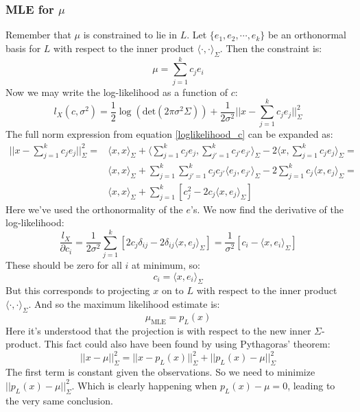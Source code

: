 \documentclass[12pt, a4paper]{article}
\numberwithin{equation}{section}
\begin{document}
\subsubsection{MLE for $\mu$}
Remember that $\mu$ is constrained to lie in $L$. Let $\{e_1,e_2,\cdots,e_k\}$ be an orthonormal basis for $L$ with respect to the inner product $\langle\cdot,\cdot\rangle_\Sigma$. Then the constraint is:
\begin{equation}
\mu=\sum_{j=1}^k c_j e_i
\end{equation}
Now we may write the log-likelihood as a function of $c$:
\begin{equation}
\label{loglikelihood_c}
l_X(c,\sigma^2)=\frac{1}{2}\log\left(\textrm{det}(2\pi\sigma^2\Sigma)\right)+\frac{1}{2\sigma^2}||x-\sum_{j=1}^k c_j e_j||^2_\Sigma
\end{equation}
The full norm expression from equation \ref{loglikelihood_c} can be expanded as:
\begin{align}
||x-\sum_{j=1}^k c_j e_j||^2_\Sigma=&\langle x,x\rangle_\Sigma+\langle\sum_{j=1}^k c_j e_j,\sum_{j'=1}^k c_{j'}e_{j'}\rangle_\Sigma-2\langle x,\sum_{j=1}^k c_j e_j\rangle_\Sigma=\\
&\langle x,x\rangle_\Sigma+\sum_{j=1}^k\sum_{j'=1}^k c_j c_{j'}\langle e_j,e_{j'}\rangle_\Sigma-2\sum_{j=1}^k c_j\langle x,e_j\rangle_\Sigma=\\
&\langle x,x\rangle_\Sigma+\sum_{j=1}^k\left[c_j^2-2c_j\langle x,e_j\rangle_\Sigma\right]
\end{align}
Here we've used the orthonormality of the $e$'s. We now find the derivative of the log-likelihood:
\begin{equation}
\frac{l_X}{\partial c_i}=\frac{1}{2\sigma^2}\sum_{j=1}^k\left[2c_j\delta_{ij}-2\delta_{ij}\langle x,e_j\rangle_\Sigma\right]=\frac{1}{\sigma^2}[c_i-\langle x,e_i\rangle_\Sigma]
\end{equation}
These should be zero for all $i$ at minimum, so:
\begin{equation}
c_i=\langle x,e_i\rangle_\Sigma\end{equation}
But this corresponds to projecting $x$ on to $L$ with respect to the inner product $\langle\cdot,\cdot\rangle_\Sigma$. And so the maximum likelihood estimate is:
\begin{equation}
\mu_{\textrm{MLE}}=p_L(x)
\end{equation}
Here it's understood that the projection is with respect to the new inner $\Sigma$-product. This fact could also have been found by using Pythagoras' theorem:
\begin{equation}
\label{pythagoras_mle}
||x-\mu||^2_\Sigma=||x-p_L(x)||^2_\Sigma+||p_L(x)-\mu||^2_\Sigma
\end{equation}
The first term is constant given the observations. So we need to minimize $||p_L(x)-\mu||^2_\Sigma$. Which is clearly happening when $p_L(x)-\mu=0$, leading to the very same conclusion.
\end{document}

